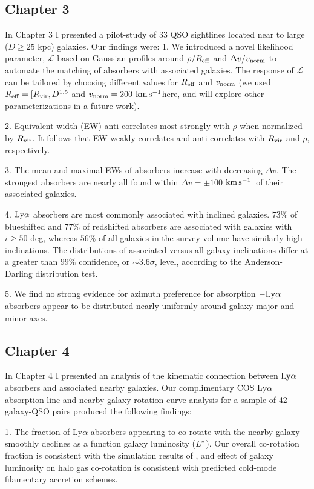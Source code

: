 \documentclass[twocolumn,tighten]{aastex62}
\newcommand{\kms}{$\rm km\, s^{-1}$}
\begin{document}
\subsection{Chapter 3}
In Chapter 3 I presented a pilot-study of 33 QSO sightlines located near to large ($D \ge 25$ kpc) galaxies. Our findings were:
1. We introduced a novel likelihood parameter, $\mathcal{L}$ based on Gaussian profiles around $\rho / R_{\rm eff}$ and $\Delta v / v_{\rm norm}$ to automate the matching of absorbers with associated galaxies. The response of $\mathcal{L}$ can be tailored by choosing different values for $R_{\rm eff}$ and $v_{\rm norm}$ (we used $R_{\rm eff} = [R_{\rm vir}, D^{\rm 1.5}$ and $v_{\rm norm} = 200$ \kms here, and will explore other parameterizations in a future work).

2. Equivalent width (EW) anti-correlates most strongly with $\rho$ when normalized by $R_{\rm vir}$. It follows that EW weakly correlates and anti-correlates with $R_{\rm vir}$ and $\rho$, respectively.

3. The mean and maximal EWs of absorbers increase with decreasing $\Delta v$. The strongest absorbers are nearly all found within $\Delta v = \pm 100$ \kms~of their associated galaxies.

4. $\rm Ly\alpha$ absorbers are most commonly associated with inclined galaxies. $73\%$ of blueshifted and $77\%$ of redshifted absorbers are associated with galaxies with $i \ge 50$ deg, whereas $56\%$ of all galaxies in the survey volume have similarly high inclinations. The distributions of associated versus all galaxy inclinations differ at a greater than $99\%$ confidence, or $\sim 3.6 \sigma$, level, according to the Anderson-Darling distribution test.

5. We find no strong evidence for azimuth preference for absorption $-\rm Ly\alpha$ absorbers appear to be distributed nearly uniformly around galaxy major and minor axes.

\subsection{Chapter 4}
In Chapter 4 I presented an analysis of the kinematic connection between $\rm Ly\alpha$ absorbers and associated nearby galaxies. Our complimentary COS Ly$\alpha$ absorption-line and nearby galaxy rotation curve analysis for a sample of 42 galaxy-QSO pairs produced the following findings:

1. The fraction of Ly$\alpha$ absorbers appearing to co-rotate with the nearby galaxy smoothly declines as a function galaxy luminosity ($L^{\**}$). Our overall co-rotation fraction is consistent with the simulation results of \cite{stewart2011b, stewart2013}, and effect of galaxy luminosity on halo gas co-rotation is consistent with predicted cold-mode filamentary accretion schemes. 
\end{document}
